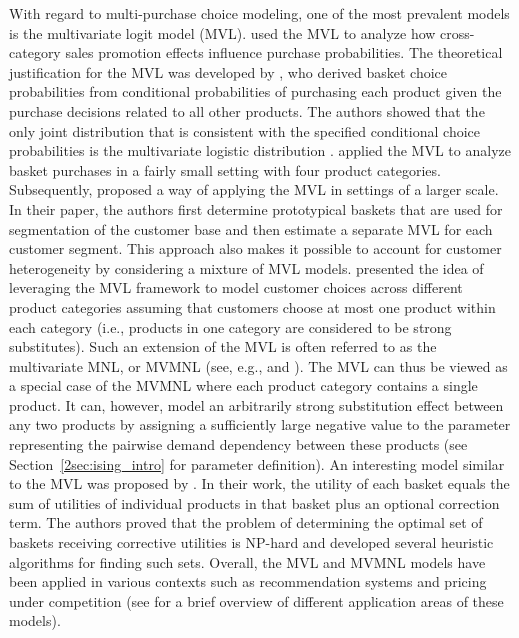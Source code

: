 With regard to multi-purchase choice modeling, one of the most prevalent models is the multivariate logit model (MVL). \cite{Hruschka1} used the MVL to analyze how cross-category sales promotion effects influence purchase probabilities.
The theoretical justification for the MVL was developed by \cite{Russell1}, who derived basket choice probabilities from conditional probabilities of purchasing each product given the purchase decisions related to all
other products. The authors showed that the only joint distribution that is consistent with the specified conditional choice probabilities is the multivariate logistic distribution \citep{Cox1}. \cite{Russell1} applied the MVL to analyze basket purchases in a fairly small setting with four product categories. Subsequently, \cite{Boztug1} proposed a way of applying the MVL in settings of a larger scale. In their paper, the authors first determine prototypical baskets that are used for segmentation of the customer base and then estimate a separate MVL for each customer segment. 
This approach also makes it possible to account for customer heterogeneity by considering a mixture of MVL models. 
\cite{Song1} presented the idea of leveraging the MVL framework to model customer choices across different product categories assuming that customers choose at most one product within each category (i.e., products in one category are considered to be strong substitutes). Such an extension of the MVL is often referred to as the multivariate MNL, or MVMNL (see, e.g., \citealp{Chen1} and \citealp{Jasin1}). The MVL can thus be viewed as a special case of the MVMNL where each product category contains a single product. It can, however, model an arbitrarily strong substitution effect between any two products by assigning a sufficiently large negative value to the parameter representing the pairwise demand dependency between these products (see Section~\ref{2sec:ising_intro} for parameter definition). An interesting model similar to the MVL was proposed by \cite{Benson1}. In their work,
the utility of each basket equals the sum of utilities of individual products in that basket plus an optional correction term. 
The authors proved that the problem of determining the optimal set of baskets receiving corrective utilities is NP-hard and developed several heuristic algorithms for finding such sets. Overall, the MVL and MVMNL models have been applied in various contexts such as recommendation systems \citep{Moon1} and pricing under competition \citep{Richards1} (see \cite{Jasin1} for a brief overview of different application areas of these models). 

